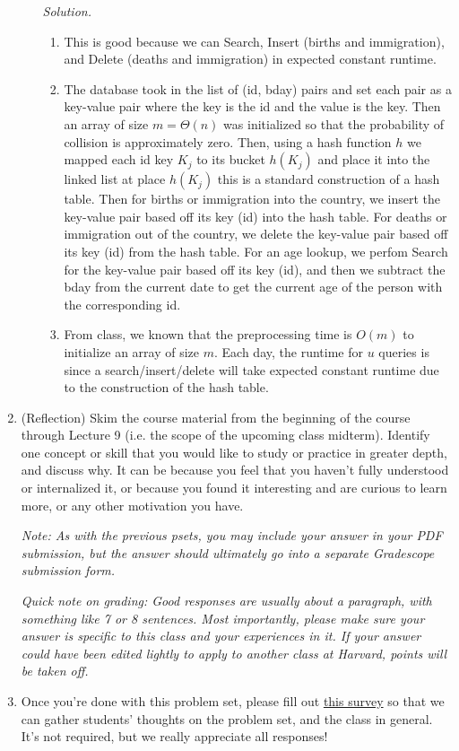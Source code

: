 \documentclass[11pt]{article}
\begin{document}
\begin{enumerate}
\begin{enumerate}
    \textit{Solution. }
    \begin{enumerate}
        \item {} This is good because we can Search, Insert (births and immigration), and Delete (deaths and immigration) in expected constant runtime.
        \item The database took in the list of (id, bday) pairs and set each pair as a key-value pair where the key is the id and the value is the key. Then an array of size $m = \Theta (n)$ was initialized so that the probability of collision is approximately zero. Then, using a hash function $h$ we mapped each id key $K_j$ to its bucket $h(K_j)$ and place it into the linked list at place $h(K_j)$ this is a standard construction of a hash table. Then for births or immigration into the country, we insert the key-value pair based off its key (id) into the hash table. For deaths or immigration out of the country, we delete the key-value pair based off its key (id) from the hash table. For an age lookup, we perfom Search for the key-value pair based off its key (id), and then we subtract the bday from the current date to get the current age of the person with the corresponding id.
        \item From class, we known that the preprocessing time is $O(m)$ to initialize an array of size $m$. Each day, the runtime for $u$ queries is  since a search/insert/delete will take expected constant runtime due to the construction of the hash table. 
    \end{enumerate}
\end{enumerate}
 \item (Reflection) Skim the course material from the beginning of the course through Lecture 9 (i.e. the scope of the upcoming class midterm).  Identify one concept or skill that you would like to study or practice in greater depth, and discuss why.  It can be because you feel that you haven't fully understood or internalized it, or because you found it interesting and are curious to learn more, or any other motivation you have. 

 \textit{Note: As with the previous psets, you may include your answer in your PDF submission, but the answer should ultimately go into a separate Gradescope submission form.}

 \textit{Quick note on grading: Good responses are usually about a paragraph, with something like 7 or 8 sentences. Most importantly, please make sure your answer is specific to this class and your experiences in it. If your answer could have been edited lightly to apply to another class at Harvard, points will be taken off.}

\item Once you're done with this problem set, please fill out \href{https://forms.gle/KvLHD5iJpY2JCoFw9}{this survey} so that we can gather students' thoughts on the problem set, and the class in general. It's not required, but we really appreciate all responses!

\end{enumerate}


 
\end{document}
